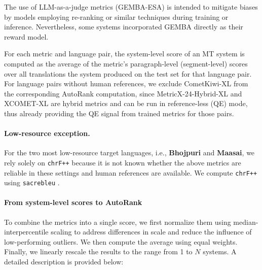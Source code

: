 \documentclass[11pt]{article}
\begin{document}
The use of LLM-as-a-judge metrics (GEMBA-ESA) is intended to mitigate biases by models employing re-ranking or similar techniques during training or inference. Nevertheless, some systems incorporated GEMBA directly as their reward model.

For each metric and language pair, the system-level score of an MT system is computed as the average of the metric’s paragraph-level (segment-level) scores over all translations the system produced on the test set for that language pair. For language pairs without human references, we exclude CometKiwi-XL from the corresponding AutoRank computation, since MetricX-24-Hybrid-XL and XCOMET-XL are hybrid metrics and can be run in reference-less (QE) mode, thus already providing the QE signal from trained metrics for those pairs.

\paragraph{Low-resource exception.}
For the two most low-resource target languages, i.e., \textbf{Bhojpuri} and \textbf{Maasai}, we rely solely on \texttt{chrF++} \citep{popovic-2017-chrf} because it is not known whether the above metrics are reliable in these settings \citep{falcao-etal-2024-comet,singh-etal-2024-good,wang-etal-2024-evaluating,sindhujan-etal-2025-llms} and human references are available. We compute \texttt{chrF++} using \texttt{sacrebleu} \citep{post-2018-call}.

\paragraph{From system-level scores to AutoRank}
To combine the metrics into a single score, we first normalize them using median-interpercentile scaling to address differences in scale and reduce the influence of low-performing outliers.
We then compute the average using equal weights. Finally, we linearly rescale the results to the range from 1 to $N$ systems. A detailed description is provided below:
\end{document}
